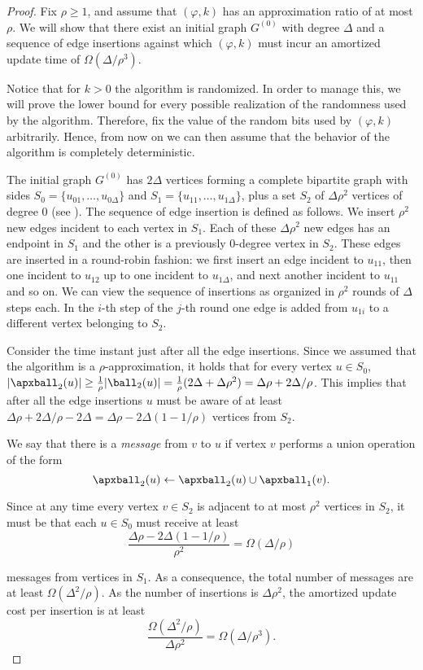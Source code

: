 \begin{proof}
Fix $\rho \ge 1$, and assume that \lazyscheme$(\varphi,k)$ has an approximation ratio of at most $\rho$. We will show that there exist an initial graph $G^{(0)}$ with degree $\Delta$ and a sequence of edge insertions against which \lazyscheme$(\varphi,k)$ must incur an amortized update time of $\Omega(\Delta/\rho^3)$.

Notice that for $k>0$ the algorithm is randomized. In order to manage this, we will prove the lower bound for every possible realization of the randomness used by the algorithm. Therefore, fix the value of the random bits used by \lazyscheme$(\varphi,k)$ arbitrarily. Hence, from now on we can then assume that the behavior of the algorithm is completely deterministic. 

The initial graph $G^{(0)}$ has $2 \Delta$ vertices forming a complete bipartite graph with sides $S_0=\{u_{01},\dots,u_{0\Delta}\}$ and $S_1=\{u_{11},\dots,u_{1\Delta}\}$, plus a set $S_2$ of $\Delta \rho^2$ vertices of degree 0 (see ). The sequence of edge insertion is defined as follows. We insert $\rho^2$ new edges incident to each vertex in $S_1$. Each of these $\Delta \rho^2$ new edges has an endpoint in $S_1$ and the other is a previously $0$-degree vertex in $S_2$. These edges are inserted in a round-robin fashion: we first insert an edge incident to $u_{11}$, then one incident to $u_{12}$ up to one incident to $u_{1\Delta}$, and next another incident to $u_{11}$ and so on. We can view the sequence of insertions as organized in $\rho^2$ rounds of $\Delta$ steps each.
In the $i$-th step of the $j$-th round one edge is added from $u_{1i}$ to a different vertex belonging to $S_2$. 

Consider the time instant just after all the edge insertions. 
Since we assumed that the algorithm is a $\rho$-approximation, it holds that for every vertex $u \in S_0$, $|\apxball_2(u)| \ge \frac{1}{\rho} |\ball_2(u)|=\frac{1}{\rho} (2\Delta+\Delta \rho^2) = \Delta \rho + 2\Delta/\rho$. This implies that after all the edge insertions $u$ must be aware of at least $\Delta \rho + 2\Delta/\rho - 2\Delta=\Delta\rho -2 \Delta(1-1/\rho)$ vertices from $S_2$. 

We say that there is a \emph{message} from $v$ to $u$ if vertex $v$ performs a union operation of the form 
\[
\apxball_2(u) \gets \apxball_2(u) \cup \apxball_1(v).  
\]

Since at any time every vertex $v \in S_2$ is adjacent to at most $\rho^2$ vertices in $S_2$, it must be that each $u \in S_0$ must receive at least 
\[
\frac{\Delta\rho -2 \Delta(1-1/\rho)}{\rho^2}=\Omega(\Delta/\rho)
\]

\noindent messages from vertices in $S_1$. As a consequence, the total number of messages are at least $\Omega(\Delta^2/\rho)$. As the number of insertions is $\Delta \rho^2$, the amortized update cost per insertion is at least 
\[
\frac{\Omega(\Delta^2/\rho)}{\Delta \rho^2}=\Omega(\Delta/\rho^3).
\]
\end{proof}

